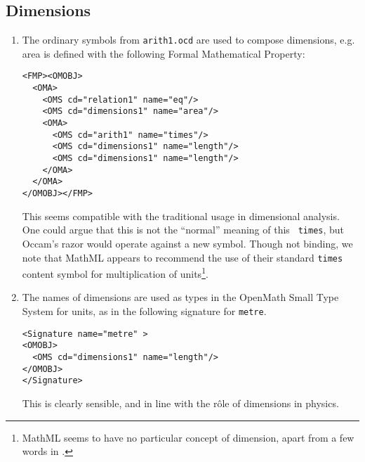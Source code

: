 \documentclass[11pt]{openmathTN}
\begin{document}
\subsection{Dimensions}\label{areasect}
\begin{enumerate}
\item\label{area}The ordinary symbols from {\tt arith1.ocd} are used to compose
dimensions, e.g. area is defined with the following Formal Mathematical
Property:
\begin{verbatim}
<FMP><OMOBJ>
  <OMA>
    <OMS cd="relation1" name="eq"/>
    <OMS cd="dimensions1" name="area"/>
    <OMA>
      <OMS cd="arith1" name="times"/>
      <OMS cd="dimensions1" name="length"/>
      <OMS cd="dimensions1" name="length"/>
    </OMA>
  </OMA>
</OMOBJ></FMP>
\end{verbatim}
This seems compatible with the traditional usage in dimensional analysis.
One could argue that this is not the ``normal'' meaning of this {\tt
times}, but Occam's razor would operate against a new symbol. Though not
binding, we note that MathML \cite[section 3]{WorldWideWebConsortium2003}
appears to recommend the use of their standard {\tt times} content
symbol for multiplication of units\footnote{MathML seems to have no
particular concept of dimension, apart from a few words in \cite[section
6.1 and Appendix C]{WorldWideWebConsortium2003}.}.
\item\label{dimtype}The names of dimensions are used as types in the
OpenMath Small Type System \cite{Davenport2000c} for units, as in the
following signature for {\tt metre}.
\begin{verbatim}
<Signature name="metre" >
<OMOBJ>
  <OMS cd="dimensions1" name="length"/>
</OMOBJ>
</Signature>
\end{verbatim}
This is clearly sensible, and in line with the r\^ole of dimensions in
physics.
\end{enumerate}
\end{document}
